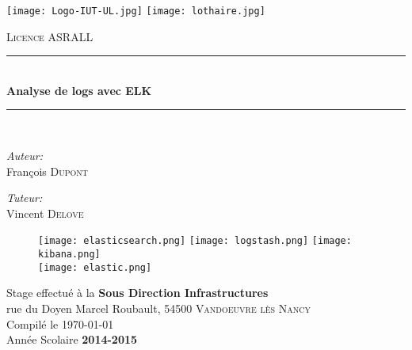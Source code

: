 \begin{titlepage}
\begin{center}
 \newcommand{\HRule}{\rule{\linewidth}{0.5mm}}

\texttt{[image: Logo-IUT-UL.jpg]}\hfill
\texttt{[image: lothaire.jpg]}
\vspace{1cm}

\textsc{\large Licence ASRALL}
\vspace{0.5cm}

\HRule \\[0.4cm]
{ \Large \bfseries Analyse de logs avec ELK\\[0.4cm] }

\HRule \\[1.0cm]

\noindent
\begin{minipage}{0.5\textwidth}
\begin{flushleft} \large
\emph{Auteur:}\\
François \textsc{Dupont}\\
\end{flushleft}
\end{minipage}%
\begin{minipage}{0.5\textwidth}
\begin{flushright} \large
\emph{Tuteur:} \\
Vincent \textsc{Delove}
\end{flushright}
\end{minipage}

%
\vspace{1cm}

\begin{figure}[h]
    \centering
    \texttt{[image: elasticsearch.png]}
    \hfill
    \texttt{[image: logstash.png]}
    \hfill
    \texttt{[image: kibana.png]}
    \\[20mm]
    \texttt{[image: elastic.png]}
\end{figure}

\vspace{3mm}
Stage effectué à la \textbf{Sous Direction Infrastructures}\\rue du Doyen Marcel Roubault, 54500 \textsc{Vandoeuvre lès Nancy}\\
{Compilé le \today}\\[5mm]%
Année Scolaire \textbf{2014-2015}%

\end{center}
\end{titlepage}
